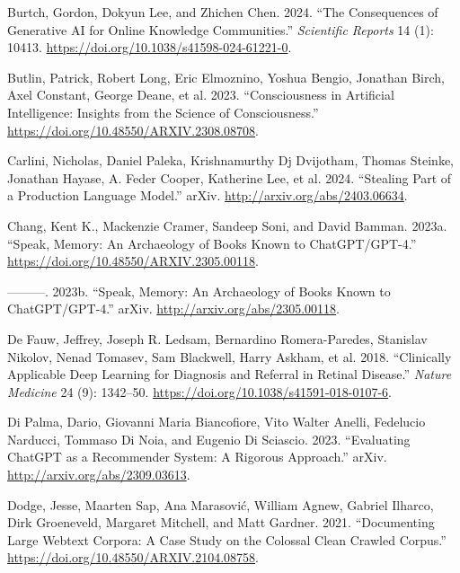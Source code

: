 \documentclass[
  Letterpaper,
]{scrbook}
\newlength{\cslhangindent}
\newenvironment{CSLReferences}[2] %
 {\begin{list}{}{%
  \setlength{\itemindent}{0pt}
  \setlength{\leftmargin}{0pt}
  \setlength{\parsep}{0pt}
  \ifodd #1
   \setlength{\leftmargin}{\cslhangindent}
   \setlength{\itemindent}{-1\cslhangindent}
  \fi
  \setlength{\itemsep}{#2\baselineskip}}}
 {\end{list}}
\begin{document}
\begin{CSLReferences}{1}{0}
Burtch, Gordon, Dokyun Lee, and Zhichen Chen. 2024. {``The Consequences
of Generative {AI} for Online Knowledge Communities.''} \emph{Scientific
Reports} 14 (1): 10413.
\url{https://doi.org/10.1038/s41598-024-61221-0}.

Butlin, Patrick, Robert Long, Eric Elmoznino, Yoshua Bengio, Jonathan
Birch, Axel Constant, George Deane, et al. 2023. {``Consciousness in
{Artificial} {Intelligence}: {Insights} from the {Science} of
{Consciousness}.''} \url{https://doi.org/10.48550/ARXIV.2308.08708}.

Carlini, Nicholas, Daniel Paleka, Krishnamurthy Dj Dvijotham, Thomas
Steinke, Jonathan Hayase, A. Feder Cooper, Katherine Lee, et al. 2024.
{``Stealing {Part} of a {Production} {Language} {Model}.''} arXiv.
\url{http://arxiv.org/abs/2403.06634}.

Chang, Kent K., Mackenzie Cramer, Sandeep Soni, and David Bamman. 2023a.
{``Speak, {Memory}: {An} {Archaeology} of {Books} {Known} to
{ChatGPT}/{GPT}-4.''} \url{https://doi.org/10.48550/ARXIV.2305.00118}.

---------. 2023b. {``Speak, {Memory}: {An} {Archaeology} of {Books}
{Known} to {ChatGPT}/{GPT}-4.''} arXiv.
\url{http://arxiv.org/abs/2305.00118}.

De Fauw, Jeffrey, Joseph R. Ledsam, Bernardino Romera-Paredes, Stanislav
Nikolov, Nenad Tomasev, Sam Blackwell, Harry Askham, et al. 2018.
{``Clinically Applicable Deep Learning for Diagnosis and Referral in
Retinal Disease.''} \emph{Nature Medicine} 24 (9): 1342--50.
\url{https://doi.org/10.1038/s41591-018-0107-6}.

Di Palma, Dario, Giovanni Maria Biancofiore, Vito Walter Anelli,
Fedelucio Narducci, Tommaso Di Noia, and Eugenio Di Sciascio. 2023.
{``Evaluating {ChatGPT} as a {Recommender} {System}: {A} {Rigorous}
{Approach}.''} arXiv. \url{http://arxiv.org/abs/2309.03613}.

Dodge, Jesse, Maarten Sap, Ana Marasović, William Agnew, Gabriel
Ilharco, Dirk Groeneveld, Margaret Mitchell, and Matt Gardner. 2021.
{``Documenting {Large} {Webtext} {Corpora}: {A} {Case} {Study} on the
{Colossal} {Clean} {Crawled} {Corpus}.''}
\url{https://doi.org/10.48550/ARXIV.2104.08758}.


\end{CSLReferences}
\end{document}
